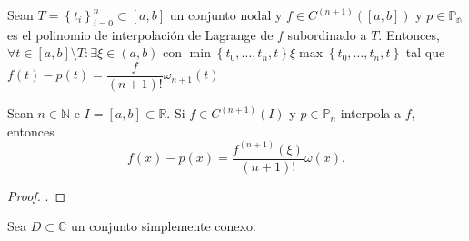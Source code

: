 \begin{frame}
    \begin{theorem}
        Sean
        \begin{math}
            T=
            {
            \left\{
            t_{i}
            \right\}
            }^{n}_{i=0}\subset
            \left[a,b\right]
        \end{math}
        un conjunto nodal y
        \begin{math}
            f\in C^{\left(n+1\right)}
            \left(\left[a,b\right]\right)
        \end{math}
        y
        \begin{math}
            p\in\mathbb{P_{n}}
        \end{math}
        es el polinomio de interpolación de Lagrange de $f$
        subordinado a $T$.
        Entonces,
        \begin{math}
            \forall t\in\left[a,b\right]\setminus T:
            \exists\xi\in\left(a,b\right)
        \end{math}
        con
        \begin{math}
            \min\left\{t_{0},\dotsc,t_{n},t\right\}
            \xi
            \max\left\{t_{0},\dotsc,t_{n},t\right\}
        \end{math}
        tal que
        \begin{math}
            f\left(t\right)-
            p\left(t\right)=
            \dfrac{f}{\left(n+1\right)!}\omega_{n+1}\left(t\right)
        \end{math}

        Sean $n\in\mathbb{N}$ e
        \begin{math}
            I=
            \left[a,b\right]\subset
            \mathbb{R}
        \end{math}.
        Si $f\in C^{\left(n+1\right)}\left(I\right)$ y
        $p\in\mathbb{P}_{n}$ interpola a $f$, entonces
        \begin{equation*}
            f\left(x\right)-
            p\left(x\right)=
            \dfrac{
                f^{\left(n+1\right)}
                \left(\xi\right)
            }{
                \left(n+1\right)!}
            \omega\left(x\right).
        \end{equation*}
    \end{theorem}

    \begin{proof}
        .
    \end{proof}
\end{frame}

\begin{frame}
    Sea $D\subset\mathbb{C}$ un conjunto simplemente conexo.
\end{frame}